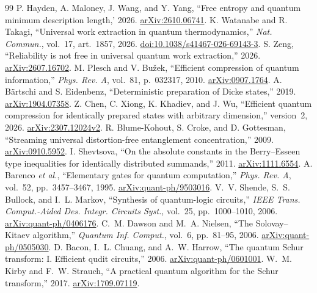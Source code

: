 \begin{thebibliography}{99}
 P. Hayden, A. Maloney, J. Wang, and Y. Yang, ``Free entropy and quantum minimum description length,' 2026. \href{https://arxiv.org/abs/2610.06741}{arXiv:2610.06741}.
 K. Watanabe and R. Takagi, ``Universal work extraction in quantum thermodynamics,'' \emph{Nat. Commun.}, vol.~17, art.~1857, 2026. \href{https://doi.org/10.1038/s41467-026-69143-3}{doi:10.1038/s41467-026-69143-3}.
 S. Zeng, ``Reliability is not free in universal quantum work extraction,'' 2026. \href{https://arxiv.org/abs/2607.16702}{arXiv:2607.16702}.
 M. Plesch and V. Bu\v{z}ek, ``Efficient compression of quantum information,'' \emph{Phys. Rev. A}, vol.~81, p.~032317, 2010. \href{https://arxiv.org/abs/0907.1764}{arXiv:0907.1764}.
 A. B\"artschi and S. Eidenbenz, ``Deterministic preparation of Dicke states,'' 2019. \href{https://arxiv.org/abs/1904.07358}{arXiv:1904.07358}.
 Z. Chen, C. Xiong, K. Khadiev, and J. Wu, ``Efficient quantum compression for identically prepared states with arbitrary dimension,'' version~2, 2026. \href{https://arxiv.org/abs/2307.12024v2}{arXiv:2307.12024v2}.
 R. Blume-Kohout, S. Croke, and D. Gottesman, ``Streaming universal distortion-free entanglement concentration,'' 2009. \href{https://arxiv.org/abs/0910.5952}{arXiv:0910.5952}.
 I. Shevtsova, ``On the absolute constants in the Berry--Esseen type inequalities for identically distributed summands,'' 2011. \href{https://arxiv.org/abs/1111.6554}{arXiv:1111.6554}.
 A. Barenco \emph{et al.}, ``Elementary gates for quantum computation,'' \emph{Phys. Rev. A}, vol.~52, pp.~3457--3467, 1995. \href{https://arxiv.org/abs/quant-ph/9503016}{arXiv:quant-ph/9503016}.
 V.~V. Shende, S.~S. Bullock, and I.~L. Markov, ``Synthesis of quantum-logic circuits,'' \emph{IEEE Trans. Comput.-Aided Des. Integr. Circuits Syst.}, vol.~25, pp.~1000--1010, 2006. \href{https://arxiv.org/abs/quant-ph/0406176}{arXiv:quant-ph/0406176}.
 C.~M. Dawson and M.~A. Nielsen, ``The Solovay--Kitaev algorithm,'' \emph{Quantum Inf. Comput.}, vol.~6, pp.~81--95, 2006. \href{https://arxiv.org/abs/quant-ph/0505030}{arXiv:quant-ph/0505030}.
 D. Bacon, I.~L. Chuang, and A.~W. Harrow, ``The quantum Schur transform: I. Efficient qudit circuits,'' 2006. \href{https://arxiv.org/abs/quant-ph/0601001}{arXiv:quant-ph/0601001}.
 W.~M. Kirby and F.~W. Strauch, ``A practical quantum algorithm for the Schur transform,'' 2017. \href{https://arxiv.org/abs/1709.07119}{arXiv:1709.07119}.

\end{thebibliography}
